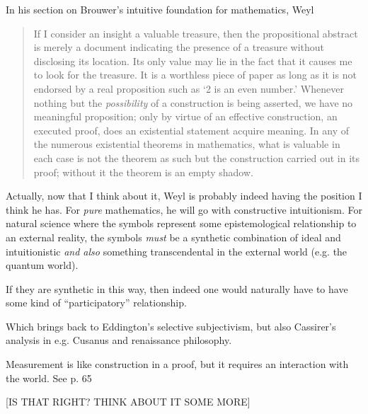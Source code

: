 In his section on Brouwer's intuitive foundation for mathematics, Weyl 

\begin{quote}
    If I consider an insight a valuable treasure, then the propositional abstract is merely a document indicating the presence of a treasure without disclosing its location.  Its only value may lie in the fact that it causes me to look for the treasure.  It is a worthless piece of paper as long as it is not endorsed by a real proposition such as `2 is an even number.'  Whenever nothing but the \emph{possibility} of a construction is being asserted, we have no meaningful proposition; only by virtue of an effective construction, an executed proof, does an existential statement acquire meaning.  In any of the numerous existential theorems in mathematics, what is valuable in each case is not the theorem as such but the construction carried out in its proof; without it the theorem is an empty shadow.

    \citep[p. 51]{Weyl1949}
\end{quote}

Actually, now that I think about it, Weyl is probably indeed having the position I think he has.  For \emph{pure} mathematics, he will go with constructive intuitionism.  For natural science where the symbols represent some epistemological relationship to an external reality, the symbols \emph{must} be a synthetic combination of ideal and intuitionistic \emph{and also} something transcendental in the external world (e.g. the quantum world).  

If they are synthetic in this way, then indeed one would naturally have to have some kind of ``participatory'' relationship.

Which brings back to Eddington's selective subjectivism, but also Cassirer's analysis in e.g. Cusanus and renaissance philosophy.  

Measurement is like construction in a proof, but it requires an interaction with the world. See p. 65 \citep[p. 65]{Weyl1949}

[IS THAT RIGHT? THINK ABOUT IT SOME MORE]

